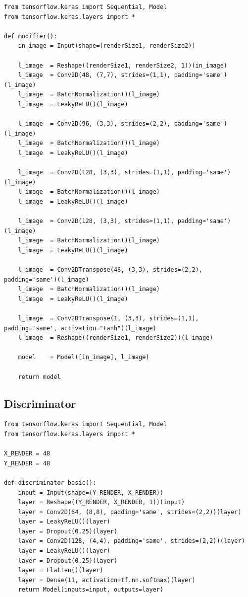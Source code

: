 \documentclass[a4paper,11pt,openany]{book}
\begin{document}
\begin{appendices}
\begin{footnotesize}
\begin{verbatim}
from tensorflow.keras import Sequential, Model
from tensorflow.keras.layers import *

def modifier():
    in_image = Input(shape=(renderSize1, renderSize2))

    l_image  = Reshape((renderSize1, renderSize2, 1))(in_image)
    l_image  = Conv2D(48, (7,7), strides=(1,1), padding='same')(l_image)
    l_image  = BatchNormalization()(l_image)
    l_image  = LeakyReLU()(l_image)

    l_image  = Conv2D(96, (3,3), strides=(2,2), padding='same')(l_image)
    l_image  = BatchNormalization()(l_image)
    l_image  = LeakyReLU()(l_image)

    l_image  = Conv2D(128, (3,3), strides=(1,1), padding='same')(l_image)
    l_image  = BatchNormalization()(l_image)
    l_image  = LeakyReLU()(l_image)

    l_image  = Conv2D(128, (3,3), strides=(1,1), padding='same')(l_image)
    l_image  = BatchNormalization()(l_image)
    l_image  = LeakyReLU()(l_image)

    l_image  = Conv2DTranspose(48, (3,3), strides=(2,2), padding='same')(l_image)
    l_image  = BatchNormalization()(l_image)
    l_image  = LeakyReLU()(l_image)

    l_image  = Conv2DTranspose(1, (3,3), strides=(1,1), padding='same', activation="tanh")(l_image)
    l_image  = Reshape((renderSize1, renderSize2))(l_image)

    model    = Model([in_image], l_image)
   
    return model
\end{verbatim}
\end{footnotesize}

\subsection*{Discriminator}
\label{sec:orgd37fee3}
\label{orgb4b9e1f}

\begin{small}
\begin{verbatim}
from tensorflow.keras import Sequential, Model
from tensorflow.keras.layers import *

X_RENDER = 48
Y_RENDER = 48

def discriminator_basic():
    input = Input(shape=(Y_RENDER, X_RENDER))
    layer = Reshape((Y_RENDER, X_RENDER, 1))(input)
    layer = Conv2D(64, (8,8), padding='same', strides=(2,2))(layer)
    layer = LeakyReLU()(layer)
    layer = Dropout(0.25)(layer)
    layer = Conv2D(128, (4,4), padding='same', strides=(2,2))(layer)
    layer = LeakyReLU()(layer)
    layer = Dropout(0.25)(layer)
    layer = Flatten()(layer)
    layer = Dense(11, activation=tf.nn.softmax)(layer)
    return Model(inputs=input, outputs=layer)


\end{verbatim}
\end{small}
\end{appendices}
\end{document}
